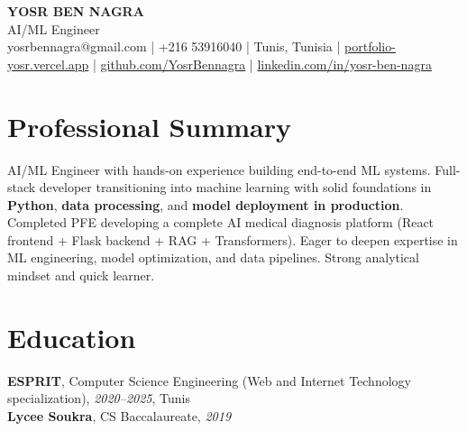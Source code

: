 \documentclass[10pt,a4paper]{article}
\begin{document}
\begin{center}
  {\Large\bfseries YOSR BEN NAGRA}\\[2pt]
  {\small AI/ML Engineer}\\[3pt]
  {\footnotesize yosrbennagra@gmail.com \;|\; +216 53916040 \;|\; Tunis, Tunisia \;|\; \href{https://portfolio-yosr.vercel.app/en}{portfolio-yosr.vercel.app} \;|\; \href{https://github.com/YosrBennagra}{github.com/YosrBennagra} \;|\; \href{https://www.linkedin.com/in/yosr-ben-nagra/}{linkedin.com/in/yosr-ben-nagra}}
\end{center}

\section*{Professional Summary}
{\small
AI/ML Engineer with hands-on experience building end-to-end ML systems. Full-stack developer transitioning into machine learning with solid foundations in \textbf{Python}, \textbf{data processing}, and \textbf{model deployment in production}. Completed PFE developing a complete AI medical diagnosis platform (React frontend + Flask backend + RAG + Transformers). Eager to deepen expertise in ML engineering, model optimization, and data pipelines. Strong analytical mindset and quick learner.
}

\vspace{4pt}

\section*{Education}
{\small
\textbf{ESPRIT}, Computer Science Engineering (Web and Internet Technology specialization), \textit{2020--2025}, Tunis\\[1pt]
\textbf{Lycee Soukra}, CS Baccalaureate, \textit{2019}
}

\vspace{4pt}

\end{document}
